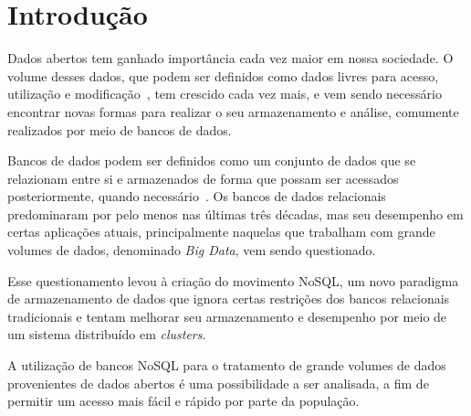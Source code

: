 \chapter{Introdução}

Dados abertos tem ganhado importância cada vez maior em nossa sociedade. O volume desses dados, que podem ser definidos como dados livres para acesso, utilização e modificação~\cite{opendefinition}, tem crescido cada vez mais, e vem sendo necessário encontrar novas formas para realizar o seu armazenamento e análise, comumente realizados por meio de bancos de dados.

Bancos de dados podem ser definidos como um conjunto de dados que se relazionam entre si e armazenados de forma que possam ser acessados posteriormente, quando necessário~\cite{leavitt2010nosql}.
Os bancos de dados relacionais predominaram por pelo menos nas últimas três décadas, mas seu desempenho em certas aplicações atuais, principalmente naquelas que trabalham com grande volumes de dados, denominado \emph{Big Data}, vem sendo questionado. 

Esse questionamento levou à criação do movimento NoSQL, um novo paradigma de armazenamento de dados que ignora certas restrições dos bancos relacionais tradicionais e tentam melhorar seu armazenamento e desempenho por meio de um sistema distribuído em \emph{clusters}.

A utilização de bancos NoSQL para o tratamento de grande volumes de dados provenientes de dados abertos é uma possibilidade a ser analisada, a fim de permitir um acesso mais fácil e rápido por parte da população. 








